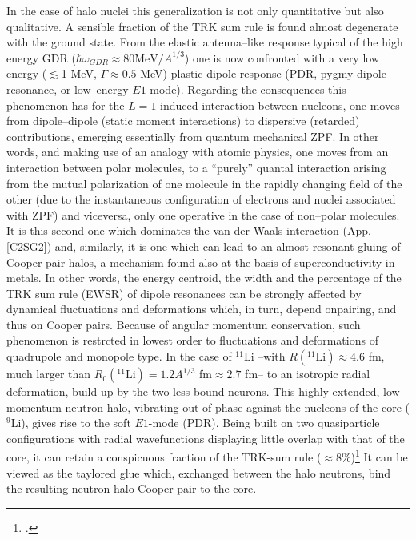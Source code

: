 In the case of halo nuclei this generalization is not only quantitative but also qualitative. A sensible fraction of the TRK sum rule is found almost degenerate with the ground state. From the elastic antenna--like response typical of the high energy GDR ($\hbar\omega_{GDR}\approx80\text{MeV}/A^{1/3}$)  one is now confronted with a very low energy ($\lesssim$1 MeV, $\Gamma\approx0.5$ MeV) plastic dipole response (PDR, pygmy dipole resonance, or low--energy $E1$ mode). Regarding the consequences this phenomenon has for the $L=1$ induced interaction between nucleons, one moves from dipole--dipole (static moment interactions) to dispersive (retarded) contributions, emerging essentially from quantum mechanical ZPF. In other words, and making use of an analogy with atomic physics, one moves from an interaction between polar molecules, to a ``purely'' quantal interaction arising from the mutual polarization of one molecule in the rapidly changing field of the other (due to the instantaneous configuration of electrons and nuclei associated with ZPF) and viceversa, only one operative in the case of non--polar molecules. It is this second one which dominates the van der Waals interaction (App. \ref{C2SG2}) and, similarly, it is one which can lead to an almost resonant gluing of Cooper pair halos, a mechanism found also at the basis of superconductivity in metals. In other words, the energy centroid, the width and the percentage of the TRK sum rule (EWSR) of dipole resonances can be strongly affected by dynamical fluctuations and deformations which, in turn, depend onpairing, and thus on Cooper pairs. Because of angular momentum conservation, such phenomenon is restrcted in lowest order to fluctuations and deformations of quadrupole and monopole type. In the case of $^{11}$Li --with $R(^{11}\text{Li})\approx4.6$ fm, much larger  than $R_0(^{11}\text{Li})=1.2A^{1/3}$ fm$\approx2.7$ fm-- to an isotropic radial deformation, build up by the two less bound neurons. This highly extended, low-momentum neutron halo, vibrating out of phase against the nucleons of the core ($^9$Li), gives rise to the soft $E1$-mode (PDR). Being built on two quasiparticle configurations with radial wavefunctions displaying little overlap with that of the core, it can retain a conspicuous fraction of the TRK-sum rule ($\approx$8\%)\footnote{\cite{Broglia:19}.} It can be viewed as the taylored glue which, exchanged between the halo neutrons, bind the resulting neutron halo Cooper pair to the core.


